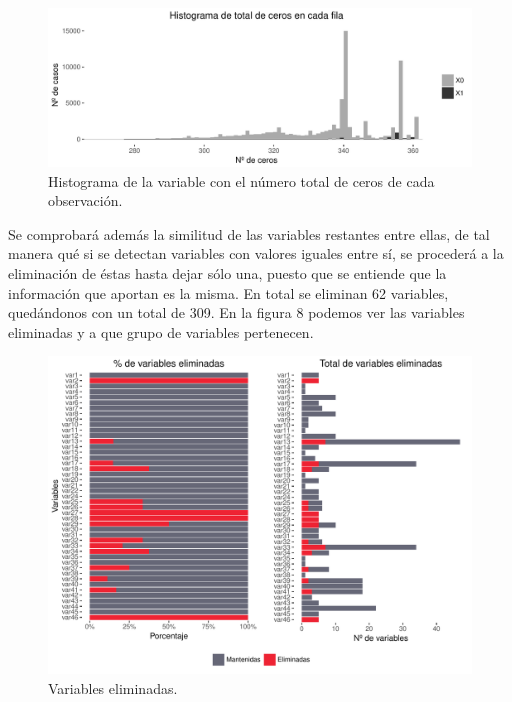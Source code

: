 \documentclass[11pt,a4paper,spanish]{article} %
\begin{document}
\begin{figure}[h!]
	\begin{center}
	\includegraphics[width=\textwidth]{Z_01_07_Historial_N_ceros.pdf}
    \caption{Histograma de la variable con el número total de ceros de cada observación.}
    \end{center}
\end{figure}


Se comprobará además la similitud de las variables restantes entre ellas, de tal manera qué si se detectan variables con valores iguales entre sí, se procederá a la eliminación de éstas hasta dejar sólo una, puesto que se entiende que la información que aportan es la misma. En total se eliminan 62 variables, quedándonos con un total de 309. En la figura 8 podemos ver las variables eliminadas y a que grupo de variables pertenecen. 

\begin{figure}[h!]
	\begin{center}
	\includegraphics[width=\textwidth]{Z_01_08_Grafico_variables_eliminadas.pdf}
    \caption{Variables eliminadas.}
    \end{center}
\end{figure}
\end{document}
